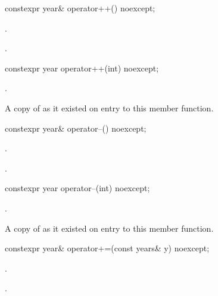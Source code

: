 %
\begin{itemdecl}
constexpr year& operator++() noexcept;
\end{itemdecl}

\begin{itemdescr}
\pnum
\effects
{}.

\pnum
\returns
{}.
\end{itemdescr}

%
\begin{itemdecl}
constexpr year operator++(int) noexcept;
\end{itemdecl}

\begin{itemdescr}
\pnum
\effects
{}.

\pnum
\returns
A copy of  as it existed on entry to this member function.
\end{itemdescr}

%
\begin{itemdecl}
constexpr year& operator--() noexcept;
\end{itemdecl}

\begin{itemdescr}
\pnum
\effects
{}.

\pnum
\returns
{}.
\end{itemdescr}

%
\begin{itemdecl}
constexpr year operator--(int) noexcept;
\end{itemdecl}

\begin{itemdescr}
\pnum
\effects
{}.

\pnum
\returns
A copy of  as it existed on entry to this member function.
\end{itemdescr}

%
\begin{itemdecl}
constexpr year& operator+=(const years& y) noexcept;
\end{itemdecl}

\begin{itemdescr}
\pnum
\effects
{}.

\pnum
\returns
{}.
\end{itemdescr}

